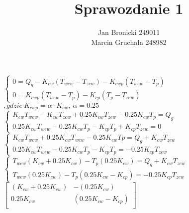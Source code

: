 \documentclass{article}
\title{Sprawozdanie 1}
\author{Jan Bronicki 249011\\
Marcin Gruchała 248982\\}
\date{}
\begin{document}
\maketitle
\begin{center}
    $
    \begin{cases}
        0=Q_{g} -K_{cw} (T_{wew} - T_{zew})-K_{cwp} (T_{wew} -T_{p})\\
        0=K_{cwp}(T_{wew}-T_{p})-K_{cp}(T_{p}-T_{zew})
    \end{cases}
    $
    \vspace{1ex}
    $
    ,gdzie \ K_{cwp}=\alpha\cdot K_{cw},\ \alpha=0.25
    $
    \vspace{1ex}
    $
    \begin{cases}
        K_{cw}T_{wew}-K_{cw}T_{zew}+0.25K_{cw}T_{zew}-0.25K_{cw}T_{p}=Q_{g}\\
        0.25K_{cw}T_{wew}-0.25K_{cw}T_{p}-K_{cp}T_{p}+K_{cp}T_{zew}=0
    \end{cases}
    $
    \vspace{1ex}
    $
        \begin{cases}
            K_{cw}T_{wew}+0.25K_{cw}T_{wew}-0.25K_{cw}T{p}=Q_{g}+K_{cw}T_{zew}\\
            0.25K_{cw}T_{wew}-0.25K_{cw}T_{p}-K_{cp}T_{p}=-0.25K_{cp}T_{zew}
        \end{cases}
    $
    \vspace{1ex}
    $
        \begin{cases}
            T_{wew}(K_{cw}+0.25K_{cw})-T_{p}(0.25K_{cw})=Q_{g}+K_{cw}T_{zew}\\
            T_{wew}(0.25K_{cw})-T_{p}(0.25K_{cw}-K_{cp})=-0.25K_{cp}T_{zew}
        \end{cases}
    $
    \vspace{1ex}\\
    $
    \begin{bmatrix}
        (K_{cw}+0.25K_{cw})& -(0.25K_{cw})            \\[0.3em]
        0.25K_{cw} & (0.25K_{cw}-K_{cp})            \\[0.3em]
    \end{bmatrix}
    $
    \vspace{1ex}
\end{center}
\end{document}
